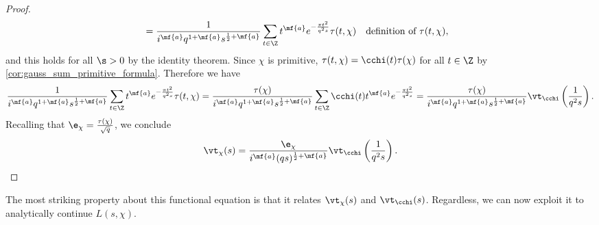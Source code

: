 \begin{proof}
\begin{align*}
          &= \frac{1}{i^{\mf{a}}q^{1+\mf{a}}s^{\frac{1}{2}+\mf{a}}}\sum_{t \in \Z}t^{\mf{a}}e^{-\frac{\pi t^{2}}{q^{2}s}}\tau(t,\chi) && \text{definition of $\tau(t,\chi)$},
        \end{align*}
        and this holds for all $\s > 0$ by the identity theorem. Since $\chi$ is primitive, $\tau(t,\chi) = \cchi(t)\tau(\chi)$ for all $t \in \Z$ by \cref{cor:gauss_sum_primitive_formula}. Therefore we have
        \[
          \frac{1}{i^{\mf{a}}q^{1+\mf{a}}s^{\frac{1}{2}+\mf{a}}}\sum_{t \in \Z}t^{\mf{a}}e^{-\frac{\pi t^{2}}{q^{2}s}}\tau(t,\chi) = \frac{\tau(\chi)}{i^{\mf{a}}q^{1+\mf{a}}s^{\frac{1}{2}+\mf{a}}}\sum_{t \in \Z}\cchi(t)t^{\mf{a}}e^{-\frac{\pi t^{2}}{q^{2}s}} = \frac{\tau(\chi)}{i^{\mf{a}}q^{1+\mf{a}}s^{\frac{1}{2}+\mf{a}}}\vt_{\cchi}\left(\frac{1}{q^{2}s}\right).
        \]
        Recalling that $\e_{\chi} = \frac{\tau(\chi)}{\sqrt{q}}$, we conclude
        \[
          \vt_{\chi}(s) = \frac{\e_{\chi}}{i^{\mf{a}}(qs)^{\frac{1}{2}+\mf{a}}}\vt_{\cchi}\left(\frac{1}{q^{2}s}\right).
        \]
      \end{proof}
      The most striking property about this functional equation is that it relates $\vt_{\chi}(s)$ and $\vt_{\cchi}(s)$. Regardless, we can now exploit it to analytically continue $L(s,\chi)$.
